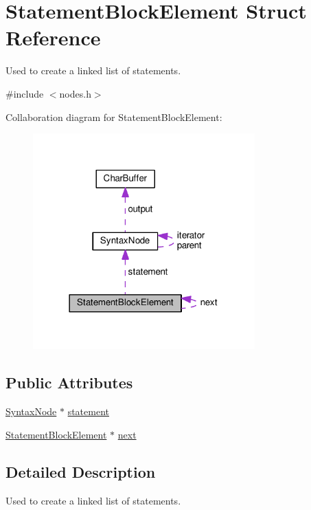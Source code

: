 \hypertarget{structStatementBlockElement}{}\section{Statement\+Block\+Element Struct Reference}
\label{structStatementBlockElement}


Used to create a linked list of statements.  




{\ttfamily \#include $<$nodes.\+h$>$}



Collaboration diagram for Statement\+Block\+Element\+:\nopagebreak
\begin{figure}[H]
\begin{center}
\leavevmode
\includegraphics[width=242pt]{structStatementBlockElement__coll__graph}
\end{center}
\end{figure}
\subsection*{Public Attributes}
\begin{DoxyCompactItemize}
\item 
\hyperlink{classSyntaxNode}{Syntax\+Node} $\ast$ \hyperlink{structStatementBlockElement_a9ac07a402a18f927cb895cdbd86d6a06}{statement}
\item 
\hyperlink{structStatementBlockElement}{Statement\+Block\+Element} $\ast$ \hyperlink{structStatementBlockElement_aa6001c0b1578810f85004ae397da2387}{next}
\end{DoxyCompactItemize}


\subsection{Detailed Description}
Used to create a linked list of statements. 

